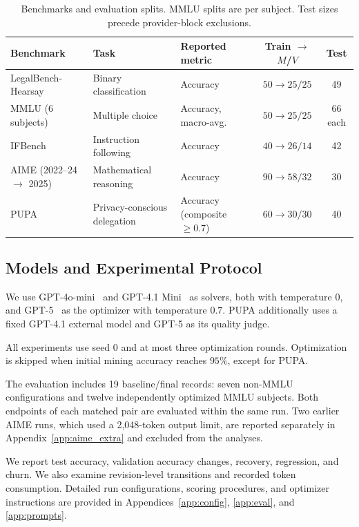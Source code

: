 \documentclass[10pt]{article} %
\begin{document}
\begin{table}[!htbp]
\caption{Benchmarks and evaluation splits. MMLU splits are per subject. Test sizes precede provider-block exclusions.}
\label{tab:setup}
\centering
\vspace{4pt}
\small
\begin{tabular}{lllcc}
\toprule
\rowcolor{midblue}
Benchmark & Task & Reported metric & Train $\rightarrow$ $M$/$V$ & Test \\
\midrule
LegalBench-Hearsay & Binary classification & Accuracy & $50\rightarrow 25/25$ & 49 \\
MMLU (6 subjects) & Multiple choice & Accuracy, macro-avg. & $50\rightarrow 25/25$ & 66 each \\
IFBench & Instruction following & Accuracy & $40\rightarrow 26/14$ & 42 \\
AIME (2022--24 $\rightarrow$ 2025) & Mathematical reasoning & Accuracy & $90\rightarrow 58/32$ & 30 \\
PUPA & Privacy-conscious delegation & Accuracy (composite $\geq 0.7$) & $60\rightarrow 30/30$ & 40 \\
\bottomrule
\end{tabular}
\end{table}

\subsection{Models and Experimental Protocol}

We use GPT-4o-mini~\citep{openai2024gpt4o} and GPT-4.1 Mini~\citep{openai2025gpt41} as solvers, both with temperature $0$, and GPT-5~\citep{openai2025gpt5} as the optimizer with temperature $0.7$. PUPA additionally uses a fixed GPT-4.1 external model and GPT-5 as its quality judge.

All experiments use seed $0$ and at most three optimization rounds. Optimization is skipped when initial mining accuracy reaches $95\%$, except for PUPA.

The evaluation includes 19 baseline/final records: seven non-MMLU configurations and twelve independently optimized MMLU subjects. Both endpoints of each matched pair are evaluated within the same run. Two earlier AIME runs, which used a 2,048-token output limit, are reported separately in Appendix~\ref{app:aime_extra} and excluded from the analyses.

We report test accuracy, validation accuracy changes, recovery, regression, and churn. We also examine revision-level transitions and recorded token consumption. Detailed run configurations, scoring procedures, and optimizer instructions are provided in Appendices~\ref{app:config}, \ref{app:eval}, and \ref{app:prompts}.
\end{document}
